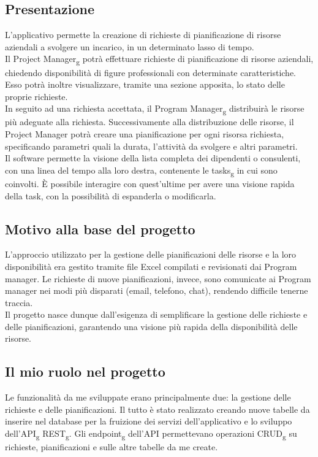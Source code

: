 \subsection{Presentazione}
L'applicativo permette la creazione di richieste di pianificazione di risorse aziendali a svolgere un incarico, in un determinato lasso di tempo.\\
Il Project Manager\textsubscript{g} potrà effettuare richieste di pianificazione di risorse aziendali, chiedendo disponibilità di figure professionali con determinate caratteristiche. Esso potrà inoltre visualizzare, tramite una sezione apposita, lo stato delle proprie richieste.\\
In seguito ad una richiesta accettata, il Program Manager\textsubscript{g} distribuirà le risorse più adeguate alla richiesta. Successivamente alla distribuzione delle risorse, il Project Manager potrà creare una pianificazione per ogni risorsa richiesta, specificando parametri quali la durata, l'attività da svolgere e altri parametri.\\
Il software permette la visione della lista completa dei dipendenti o consulenti, con una linea del tempo alla loro destra, contenente le tasks\textsubscript{g} in cui sono coinvolti. È possibile interagire con quest'ultime per avere una visione rapida della task, con la possibilità di espanderla o modificarla.

\subsection{Motivo alla base del progetto}
L'approccio utilizzato per la gestione delle pianificazioni delle risorse e la loro disponibilità era gestito tramite file Excel compilati e revisionati dai Program manager. Le richieste di nuove pianificazioni, invece, sono comunicate ai Program manager nei modi più disparati (email, telefono, chat), rendendo difficile tenerne traccia.\\
Il progetto nasce dunque dall’esigenza di semplificare la gestione delle richieste e delle pianificazioni, garantendo una visione più rapida della disponibilità delle risorse.

\subsection{Il mio ruolo nel progetto}
Le funzionalità da me sviluppate erano principalmente due: la gestione delle richieste e delle pianificazioni.
Il tutto è stato realizzato creando nuove tabelle da inserire nel database per la fruizione dei servizi dell'applicativo e lo sviluppo dell'API\textsubscript{g} REST\textsubscript{g}. Gli endpoint\textsubscript{g} dell'API permettevano operazioni CRUD\textsubscript{g} su richieste, pianificazioni e sulle altre tabelle da me create.


